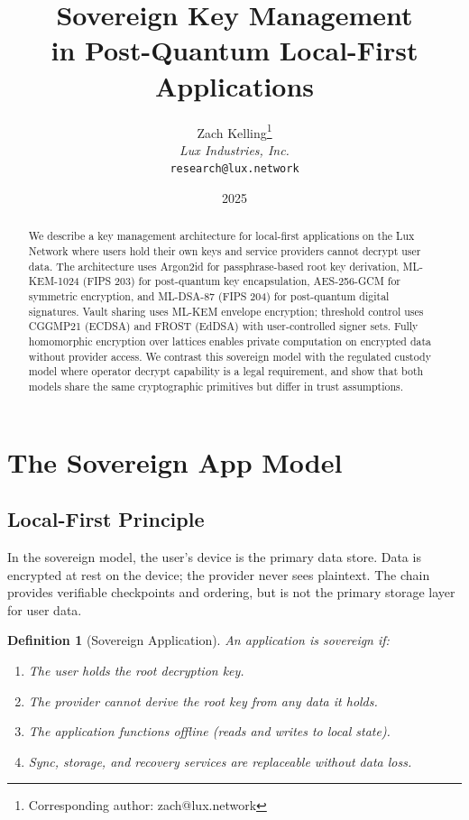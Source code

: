 \documentclass[11pt,a4paper]{article}
\title{\textbf{Sovereign Key Management\\in Post-Quantum Local-First Applications}}
\author{
Zach Kelling\thanks{Corresponding author: zach@lux.network} \\[6pt]
\textit{Lux Industries, Inc.} \\
\texttt{research@lux.network}
}
\date{2025}
\newtheorem{definition}{Definition}[section]
\begin{document}
\luxcoverpage

\begin{abstract}
We describe a key management architecture for local-first applications on
the Lux Network where users hold their own keys and service providers
cannot decrypt user data.  The architecture uses Argon2id for passphrase-based
root key derivation, ML-KEM-1024 (FIPS 203) for post-quantum key encapsulation,
AES-256-GCM for symmetric encryption, and ML-DSA-87 (FIPS 204) for
post-quantum digital signatures.  Vault sharing uses ML-KEM envelope
encryption; threshold control uses CGGMP21 (ECDSA) and FROST (EdDSA)
with user-controlled signer sets.  Fully homomorphic encryption over
lattices enables private computation on encrypted data without provider
access.  We contrast this sovereign model with the regulated custody model
where operator decrypt capability is a legal requirement, and show that
both models share the same cryptographic primitives but differ in trust
assumptions.
\end{abstract}

\tableofcontents
\newpage

\section{The Sovereign App Model}
\label{sec:model}

\subsection{Local-First Principle}

In the sovereign model, the user's device is the primary data store.  Data
is encrypted at rest on the device; the provider never sees plaintext.  The
chain provides verifiable checkpoints and ordering, but is not the primary
storage layer for user data.

\begin{definition}[Sovereign Application]
An application is \emph{sovereign} if:
\begin{enumerate}[nosep]
  \item The user holds the root decryption key.
  \item The provider cannot derive the root key from any data it holds.
  \item The application functions offline (reads and writes to local state).
  \item Sync, storage, and recovery services are replaceable without data loss.
\end{enumerate}
\end{definition}
\end{document}
